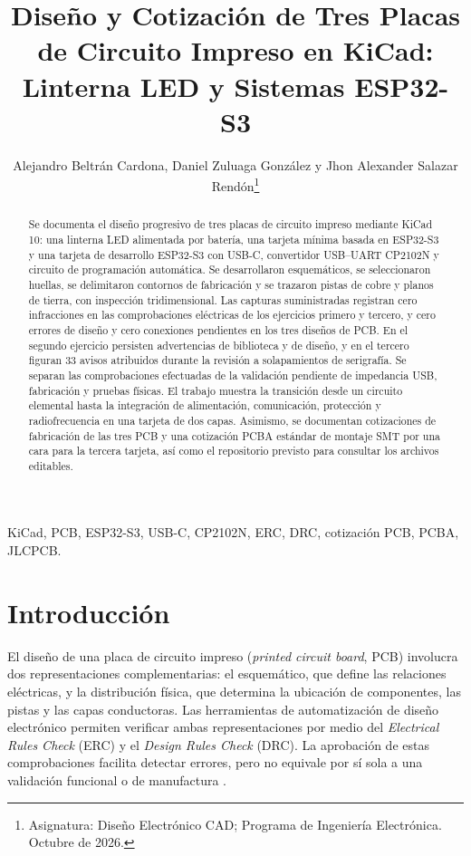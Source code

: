 \documentclass[journal,10pt]{IEEEtran}
\title{Diseño y Cotización de Tres Placas de Circuito Impreso en KiCad: Linterna LED y Sistemas ESP32-S3}
\author{{Alejandro Beltrán Cardona, Daniel Zuluaga González y Jhon Alexander Salazar Rendón\thanks{Asignatura: Diseño Electrónico CAD; Programa de Ingeniería Electrónica. Octubre de 2026.}}}
\begin{document}
\maketitle

\begin{abstract}
Se documenta el diseño progresivo de tres placas de circuito impreso mediante KiCad 10: una linterna LED alimentada por batería, una tarjeta mínima basada en ESP32-S3 y una tarjeta de desarrollo ESP32-S3 con USB-C, convertidor USB--UART CP2102N y circuito de programación automática. Se desarrollaron esquemáticos, se seleccionaron huellas, se delimitaron contornos de fabricación y se trazaron pistas de cobre y planos de tierra, con inspección tridimensional. Las capturas suministradas registran cero infracciones en las comprobaciones eléctricas de los ejercicios primero y tercero, y cero errores de diseño y cero conexiones pendientes en los tres diseños de PCB. En el segundo ejercicio persisten advertencias de biblioteca y de diseño, y en el tercero figuran 33 avisos atribuidos durante la revisión a solapamientos de serigrafía. Se separan las comprobaciones efectuadas de la validación pendiente de impedancia USB, fabricación y pruebas físicas. El trabajo muestra la transición desde un circuito elemental hasta la integración de alimentación, comunicación, protección y radiofrecuencia en una tarjeta de dos capas. Asimismo, se documentan cotizaciones de fabricación de las tres PCB y una cotización PCBA estándar de montaje SMT por una cara para la tercera tarjeta, así como el repositorio previsto para consultar los archivos editables.
\end{abstract}

\begin{IEEEkeywords}
KiCad, PCB, ESP32-S3, USB-C, CP2102N, ERC, DRC, cotización PCB, PCBA, JLCPCB.
\end{IEEEkeywords}

\section{Introducción}
El diseño de una placa de circuito impreso (\emph{printed circuit board}, PCB) involucra dos representaciones complementarias: el esquemático, que define las relaciones eléctricas, y la distribución física, que determina la ubicación de componentes, las pistas y las capas conductoras. Las herramientas de automatización de diseño electrónico permiten verificar ambas representaciones por medio del \emph{Electrical Rules Check} (ERC) y el \emph{Design Rules Check} (DRC). La aprobación de estas comprobaciones facilita detectar errores, pero no equivale por sí sola a una validación funcional o de manufactura \cite{kicad}.
\end{document}
